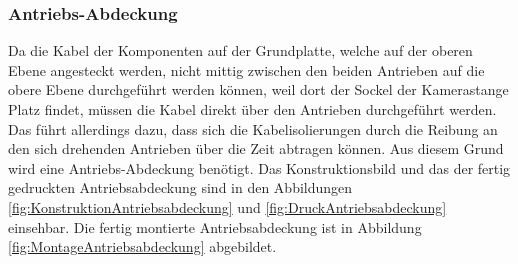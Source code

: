 \subsubsection{Antriebs-Abdeckung}\label{Sec2Sub2SubSub7}

Da die Kabel der Komponenten auf der Grundplatte, welche auf der oberen Ebene angesteckt werden, nicht mittig zwischen den beiden Antrieben auf die obere Ebene durchgeführt werden können, weil dort der Sockel der Kamerastange Platz findet, müssen die Kabel direkt über den Antrieben durchgeführt werden. Das führt allerdings dazu, dass sich die Kabelisolierungen durch die Reibung an den sich drehenden Antrieben über die Zeit abtragen können. Aus diesem Grund wird eine Antriebs-Abdeckung benötigt. Das Konstruktionsbild und das der fertig gedruckten Antriebsabdeckung sind in den Abbildungen  \ref{fig:KonstruktionAntriebsabdeckung} und \ref{fig:DruckAntriebsabdeckung} einsehbar. Die fertig montierte Antriebsabdeckung ist in Abbildung \ref{fig:MontageAntriebsabdeckung} abgebildet.

